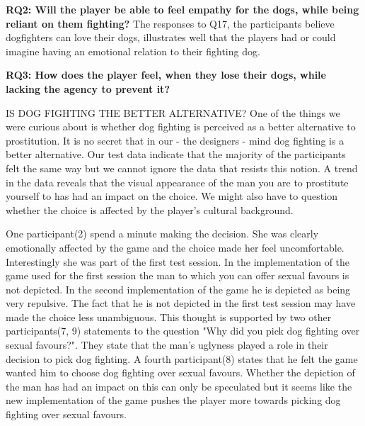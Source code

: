 \textbf{RQ2:  Will the player be able to feel empathy for the dogs, while being reliant on them fighting?}
The responses to Q17, the participants believe dogfighters can love their dogs, illustrates well that the players had or could imagine having an emotional relation to their fighting dog. 



\textbf{RQ3: How does the player feel, when they lose their dogs, while lacking the agency to prevent it?}








IS DOG FIGHTING THE BETTER ALTERNATIVE?
One of the things we were curious about is whether dog fighting is perceived as a better alternative to prostitution. It is no secret that in our - the designers - mind dog fighting is a better alternative. Our test data indicate that the majority of the participants felt the same way but we cannot ignore the data that resists this notion. A trend in the data reveals that the visual appearance of the man you are to prostitute yourself to has had an impact on the choice. We might also have to question whether the choice is affected by the player's cultural background.

One participant(2) spend a minute making the decision. She was clearly emotionally affected by the game and the choice made her feel uncomfortable. Interestingly she was part of the first test session. In the implementation of the game used for the first session the man to which you can offer sexual favours is not depicted. In the second implementation of the game he is depicted as being very repulsive.   The fact that he is not depicted in the first test session may have made the choice less unambiguous. This thought is supported by two other participants(7, 9) statements to the question "Why did you pick dog fighting over sexual favours?". They state that the man's uglyness played a role in their decision to pick dog fighting. A fourth participant(8) states that he felt the game wanted him to choose dog fighting over sexual favours. Whether the depiction of the man has had an impact on this can only be speculated but it seems like the new implementation of the game pushes the player more towards picking dog fighting over sexual favours.

